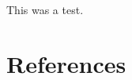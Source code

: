 \documentclass[12pt]{article}
\begin{document}
This was a test\cite{10.6028/NBS.BMS.108}.
\section*{References}


\end{document}
